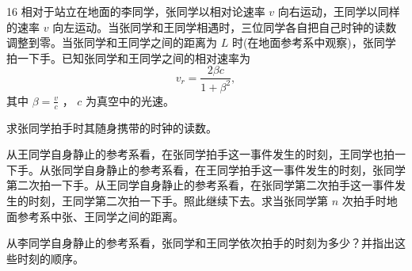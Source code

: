 \begin{problem}[第30届全国中学生物理竞赛决赛][相对论时钟拍手问题]{16}
相对于站立在地面的李同学，张同学以相对论速率 $v$ 向右运动，王同学以同样的速率 $v$ 向左运动。当张同学和王同学相遇时，三位同学各自把自己时钟的读数调整到零。当张同学和王同学之间的距离为 $L$ 时(在地面参考系中观察)，张同学拍一下手。已知张同学和王同学之间的相对速率为
\begin{equation*}
v _ {r} = \frac {2 \beta c}{1 + \beta^ {2}},
\end{equation*}
其中 $\beta=\frac{v}{c}$ ， $c$ 为真空中的光速。
\begin{subproblem}
求张同学拍手时其随身携带的时钟的读数。
\end{subproblem}
\begin{subproblem}
从王同学自身静止的参考系看，在张同学拍手这一事件发生的时刻，王同学也拍一下手。从张同学自身静止的参考系看，在王同学拍手这一事件发生的时刻，张同学第二次拍一下手。从王同学自身静止的参考系看，在张同学第二次拍手这一事件发生的时刻，王同学第二次拍一下手。照此继续下去。求当张同学第 $n$ 次拍手时地面参考系中张、王同学之间的距离。
\end{subproblem}
\begin{subproblem}
从李同学自身静止的参考系看，张同学和王同学依次拍手的时刻为多少？并指出这些时刻的顺序。
\end{subproblem}
\end{problem}